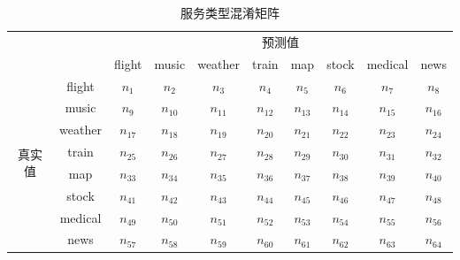 \begin{table}[htb]
      \centering
      \caption{服务类型混淆矩阵}
      \label{tab:hunxiao}
  \begin{tabular}{c|c|c|c|c|c|c|c|c|c}
    \toprule
    \multicolumn{2}{c|}{\multirow{2}{*}{}}&
    \multicolumn{8}{c}{预测值}\\
    \cline{3-10}
    \multicolumn{2}{c|}{}&flight & music & weather & train & map &stock &medical & news \\
     \hline
     \multirow{8}{*}{真实值}&
     flight&$n_1$&$n_2$&$n_3$&$n_4$&$n_5$&$n_6$&$n_7$&$n_8$\\
     \cline{2-10}
     \multicolumn{1}{c|}{}&music&$n_{9}$&$n_{10}$&$n_{11}$&$n_{12}$&$n_{13}$&$n_{14}$&$n_{15}$&$n_{16}$\\
     \cline{2-10}
     \multicolumn{1}{c|}{}&weather&$n_{17}$&$n_{18}$&$n_{19}$&$n_{20}$&$n_{21}$&$n_{22}$&$n_{23}$&$n_{24}$\\
     \cline{2-10}
     \multicolumn{1}{c|}{}&train&$n_{25}$&$n_{26}$&$n_{27}$&$n_{28}$&$n_{29}$&$n_{30}$&$n_{31}$&$n_{32}$\\
     \cline{2-10}
     \multicolumn{1}{c|}{}&map&$n_{33}$&$n_{34}$&$n_{35}$&$n_{36}$&$n_{37}$&$n_{38}$&$n_{39}$&$n_{40}$\\
     \cline{2-10}
     \multicolumn{1}{c|}{}&stock&$n_{41}$&$n_{42}$&$n_{43}$&$n_{44}$&$n_{45}$&$n_{46}$&$n_{47}$&$n_{48}$\\
     \cline{2-10}
     \multicolumn{1}{c|}{}&medical&$n_{49}$&$n_{50}$&$n_{51}$&$n_{52}$&$n_{53}$&$n_{54}$&$n_{55}$&$n_{56}$\\
     \cline{2-10}
     \multicolumn{1}{c|}{}&news&$n_{57}$&$n_{58}$&$n_{59}$&$n_{60}$&$n_{61}$&$n_{62}$&$n_{63}$&$n_{64}$\\
    \bottomrule
    \end{tabular}
  \end{table}

